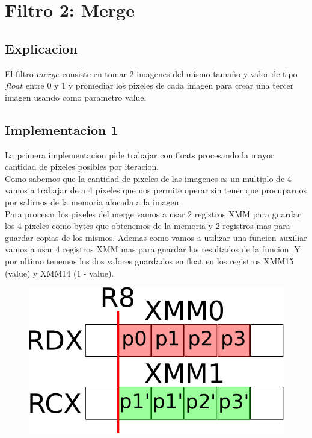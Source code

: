 \section{Filtro 2: Merge}

\subsection{Explicacion}
El filtro $merge$ consiste en tomar 2 imagenes del mismo tamaño y valor de tipo $float$ entre 0 y 1 y promediar los pixeles de cada imagen para crear una tercer imagen usando como parametro value. \\

\subsection{Implementacion 1}
La primera implementacion pide trabajar con floats procesando la mayor cantidad de pixeles posibles por iteracion. \\

Como sabemos que la cantidad de pixeles de las imagenes es un multiplo de 4 vamos a trabajar de a 4 pixeles que nos permite operar sin tener que procuparnos por salirnos de la memoria alocada a la imagen. \\

Para procesar los pixeles del merge vamos a usar 2 registros XMM para guardar los 4 pixeles como bytes que obtenemos de la memoria y 2 registros mas para guardar copias de los mismos. Ademas como vamos a utilizar una funcion auxiliar vamos a usar 4 registros XMM mas para guardar los resultados de la funcion. Y por ultimo tenemos los dos valores guardados en float en los registros XMM15 (value) y XMM14 (1 - value). \\

\begin{figure}[h!]
	\centering
	\includegraphics[scale=0.5]{images/MergeASM1_0}
\end{figure}

